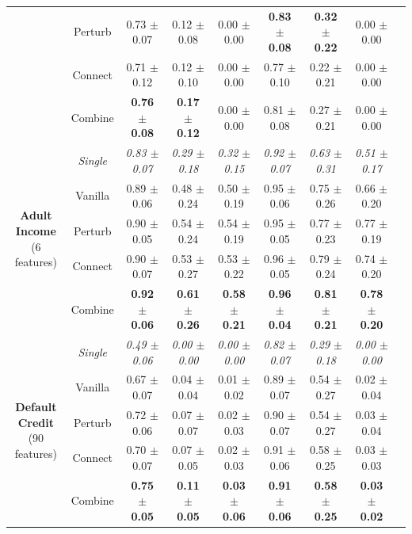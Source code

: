 \begin{table}[t]
\begin{tabular}{ccccccccc}
    & Perturb & 0.73 $\pm$ 0.07 & 0.12 $\pm$ 0.08 & 0.00 $\pm$ 0.00 & \textbf{0.83 $\pm$ 0.08} & \textbf{0.32 $\pm$ 0.22} & 0.00 $\pm$ 0.00 \\
    & Connect & 0.71 $\pm$ 0.12 & 0.12 $\pm$ 0.10 & 0.00 $\pm$ 0.00 & 0.77 $\pm$ 0.10 & 0.22 $\pm$ 0.21 & 0.00 $\pm$ 0.00 \\
    & Combine & \textbf{0.76 $\pm$ 0.08} & \textbf{0.17 $\pm$ 0.12} & 0.00 $\pm$ 0.00 & 0.81 $\pm$ 0.08 & 0.27 $\pm$ 0.21 & 0.00 $\pm$ 0.00 \\ \midrule
\multirow{5}{*}{\parbox{0.09\textwidth}{\centering\textbf{Adult\\Income}\\ \scriptsize (6 features)}}
    & \textit{Single} & \textit{0.83 $\pm$ 0.07} & \textit{0.29 $\pm$ 0.18} & \textit{0.32 $\pm$ 0.15} & \textit{0.92 $\pm$ 0.07} & \textit{0.63 $\pm$ 0.31} & \textit{0.51 $\pm$ 0.17} \\
    & Vanilla & 0.89 $\pm$ 0.06 & 0.48 $\pm$ 0.24 & 0.50 $\pm$ 0.19 & 0.95 $\pm$ 0.06 & 0.75 $\pm$ 0.26 & 0.66 $\pm$ 0.20 \\
    & Perturb & 0.90 $\pm$ 0.05 & 0.54 $\pm$ 0.24 & 0.54 $\pm$ 0.19 & 0.95 $\pm$ 0.05 & 0.77 $\pm$ 0.23 & 0.77 $\pm$ 0.19 \\
    & Connect & 0.90 $\pm$ 0.07 & 0.53 $\pm$ 0.27 & 0.53 $\pm$ 0.22 & 0.96 $\pm$ 0.05 & 0.79 $\pm$ 0.24 & 0.74 $\pm$ 0.20 \\
    & Combine & \textbf{0.92 $\pm$ 0.06} & \textbf{0.61 $\pm$ 0.26} & \textbf{0.58 $\pm$ 0.21} & \textbf{0.96 $\pm$ 0.04} & \textbf{0.81 $\pm$ 0.21} & \textbf{0.78 $\pm$ 0.20} \\\midrule
\multirow{5}{*}{\parbox{0.09\textwidth}{\centering\textbf{Default\\Credit}\\ \scriptsize (90 features)}}
    & \textit{Single} & \textit{0.49 $\pm$ 0.06} & \textit{0.00 $\pm$ 0.00} & \textit{0.00 $\pm$ 0.00} & \textit{0.82 $\pm$ 0.07} & \textit{0.29 $\pm$ 0.18} & \textit{0.00 $\pm$ 0.00} \\
    & Vanilla & 0.67 $\pm$ 0.07 & 0.04 $\pm$ 0.04 & 0.01 $\pm$ 0.02 & 0.89 $\pm$ 0.07 & 0.54 $\pm$ 0.27 & 0.02 $\pm$ 0.04 \\
    & Perturb & 0.72 $\pm$ 0.06 & 0.07 $\pm$ 0.07 & 0.02 $\pm$ 0.03 & 0.90 $\pm$ 0.07 & 0.54 $\pm$ 0.27 & 0.03 $\pm$ 0.04 \\
    & Connect & 0.70 $\pm$ 0.07 & 0.07 $\pm$ 0.05 & 0.02 $\pm$ 0.03 & 0.91 $\pm$ 0.06 & 0.58 $\pm$ 0.25 & 0.03 $\pm$ 0.03 \\
    & Combine & \textbf{0.75 $\pm$ 0.05} & \textbf{0.11 $\pm$ 0.05} & \textbf{0.03 $\pm$ 0.06} & \textbf{0.91 $\pm$ 0.06} & \textbf{0.58 $\pm$ 0.25} & \textbf{0.03 $\pm$ 0.02} \\ \midrule

\end{tabular}
\end{table}
